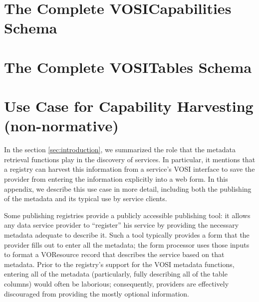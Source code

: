 \documentclass[11pt,letter]{ivoa}
\begin{document}
\appendix
\section{The Complete VOSICapabilities Schema}
\label{appendix:capabilities}



\section{The Complete VOSITables Schema}
\label{appendix:tables}



\section{Use Case for Capability Harvesting (non-normative)}
\label{appendix:harvesting}

 In the section \ref{sec:introduction}, we summarized the role that the
 metadata retrieval functions play in the discovery of services. In
 particular, it mentions that a registry can harvest this information
 from a service's VOSI interface to save the provider from entering the
 information explicitly into a web form. In this appendix, we describe
 this use case in more detail, including both the publishing of the
 metadata and its typical use by service clients.

Some publishing registries \citep{2018ivoa.spec.0723D} provide a
publicly accessible publishing tool: it allows any data service provider
to ``register'' his service by providing the necessary metadata adequate
to describe it. Such a tool typically provides a form that the provider
fills out to enter all the metadata; the form processor uses those
inputs to format a VOResource record that describes the service based on
that metadata. Prior to the registry's support for the VOSI metadata
functions, entering all of the metadata (particularly, fully describing
all of the table columns) would often be laborious; consequently,
providers are effectively discouraged from providing the mostly optional
information.
\end{document}
